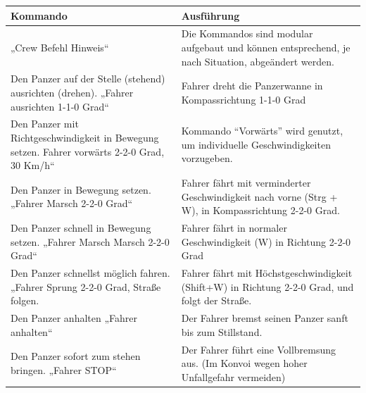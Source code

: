 	\begin{longtable}{p{}p{}} 
		\toprule
		Kommando & Ausführung\\
		\midrule
		„Crew  Befehl  Hinweis“ & Die Kommandos sind modular aufgebaut und können entsprechend, je nach Situation, abgeändert werden.\\
		\midrule
		Den Panzer auf der Stelle (stehend) ausrichten (drehen).\vspace{6pt}\nl
		„Fahrer ausrichten 1-1-0 Grad“
		& Fahrer dreht die Panzerwanne in Kompassrichtung 1-1-0 Grad\\
		\midrule
		Den Panzer mit Richtgeschwindigkeit in Bewegung setzen.\vspace{6pt}\nl
		Fahrer vorwärts 2-2-0 Grad, 30 Km/h“
		& Kommando “Vorwärts” wird genutzt, um individuelle Geschwindigkeiten vorzugeben.\\
		\midrule
		Den Panzer in Bewegung setzen.\vspace{6pt}\nl
		„Fahrer Marsch 2-2-0 Grad“
		& Fahrer fährt mit verminderter Geschwindigkeit nach vorne (Strg + W), in Kompassrichtung 2-2-0 Grad.\\
		\midrule
		Den Panzer schnell in Bewegung setzen.\vspace{6pt}\nl
		„Fahrer  Marsch Marsch 2-2-0 Grad“
		& Fahrer fährt in normaler Geschwindigkeit (W) in Richtung 2-2-0 Grad\\
		\midrule
		Den Panzer schnellst möglich fahren.\vspace{6pt}\nl
		„Fahrer Sprung 2-2-0 Grad, Straße folgen.
		& Fahrer fährt mit Höchstgeschwindigkeit (Shift+W) in Richtung 2-2-0 Grad, und folgt der Straße.\\
		\midrule
		Den Panzer anhalten\vspace{6pt}\nl
		„Fahrer anhalten“
		& Der Fahrer bremst seinen Panzer sanft bis zum Stillstand.\\
		\midrule
		Den Panzer sofort zum stehen bringen.\vspace{6pt}\nl
		„Fahrer STOP“
		& Der Fahrer führt eine Vollbremsung aus. (Im Konvoi wegen hoher Unfallgefahr vermeiden)\\		 
		\bottomrule 
	\end{longtable}	